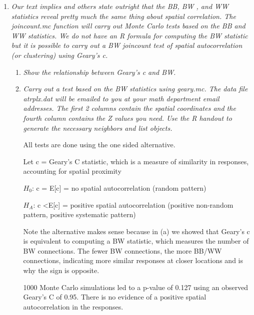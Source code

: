 \documentclass{article}\usepackage[]{graphicx}\usepackage[]{color}
\makeatletter
\newenvironment{kframe}{%
 \def\at@end@of@kframe{}%
 \ifinner\ifhmode%
  \def\at@end@of@kframe{\end{minipage}}%
  \begin{minipage}{\columnwidth}%
 \fi\fi%
 \def\FrameCommand##1{\hskip\@totalleftmargin \hskip-\fboxsep
 \colorbox{shadecolor}{##1}\hskip-\fboxsep
     \hskip-\linewidth \hskip-\@totalleftmargin \hskip\columnwidth}%
 \MakeFramed {\advance\hsize-\width
   \@totalleftmargin\z@ \linewidth\hsize
   \@setminipage}}%
 {\par\unskip\endMakeFramed%
 \at@end@of@kframe}
\newenvironment{knitrout}{}{} %
\makeatother
\begin{document}
\begin{enumerate}
\item {\it Our text implies and others state outright that the BB, BW , and WW statistics reveal pretty much the same thing about spatial correlation. The joincount.mc function will carry out Monte Carlo tests based on the BB and WW statistics. We do not have an R formula for computing the BW statistic but it is possible to carry out a BW joincount test of spatial autocorrelation (or clustering) using Geary’s c.}

\begin{enumerate}
\item {\it Show the relationship between Geary’s c and BW.}
\vspace{3in}

\item {\it Carry out a test based on the BW statistics using geary.mc. The data file atrplx.dat will be emailed to you at your math department email addresses. The first 2 columns contain the spatial coordinates and the fourth column contains the Z values you need. Use the R handout to generate the necessary neighbors and list objects.}

All tests are done using the one sided alternative.

Let c = Geary's C statistic, which is a measure of similarity in responses, accounting for spatial proximity

$H_{0}$: c = E[c] = no spatial autocorrelation (random pattern)

$H_{A}$: c \textless E[c] = positive spatial autocorrelation (positive non-random pattern, positive systematic pattern)

Note the alternative makes sense because in (a) we showed that Geary's c is equivalent to computing a BW statistic, which measures the number of BW connections. The fewer BW connections, the more BB/WW connections, indicating more similar responses at closer locations and is why the sign is opposite. 

1000 Monte Carlo simulations led to a p-value of 0.127 using an observed Geary's C of 0.95. There is no evidence of a positive spatial autocorrelation in the responses. 





\begin{knitrout}\footnotesize
{}\color{fgcolor}\begin{kframe}
\begin{verbatim}


\end{verbatim}
\end{kframe}
\end{knitrout}
\end{enumerate}
\end{enumerate}
\end{document}
